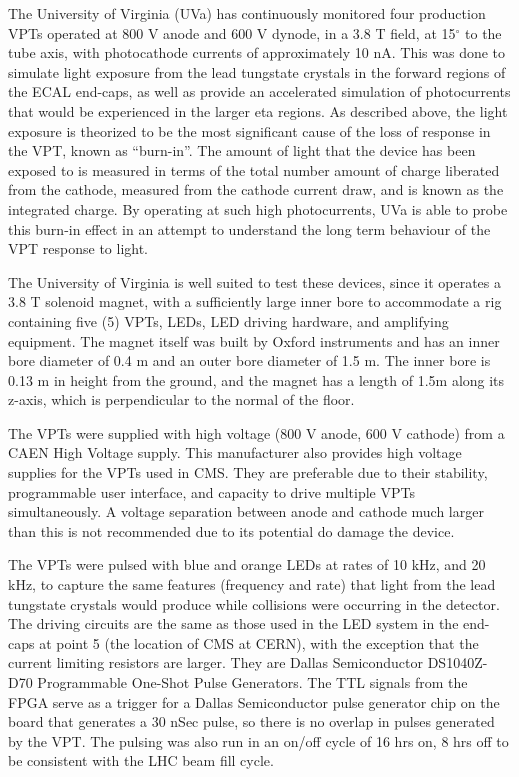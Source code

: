 \par The University of Virginia (UVa) has continuously monitored four
production VPTs operated at 800 V anode and 600 V dynode, in a 3.8 T
field, at 15$^\circ$ to the tube axis, with photocathode currents of
approximately 10 nA.  This was done to simulate light exposure from
the lead tungstate crystals in the forward regions of the ECAL
end-caps, as well as provide an accelerated simulation of
photocurrents that would be experienced in the larger eta regions.  As
described above, the light exposure is theorized
to be the most significant cause of the loss of response in the VPT,
known as “burn-in”.  The amount of light that the device has been
exposed to is measured in terms of the total number amount of charge
liberated from the cathode, measured from the cathode current draw,
and is known as the integrated charge.  By operating at such high
photocurrents, UVa is able to probe this burn-in effect in an attempt
to understand the long term behaviour of the VPT response to light.  

\par The University of Virginia is well suited to test these devices,
since it operates a 3.8 T solenoid magnet, with a sufficiently large
inner bore to accommodate a rig containing five (5) VPTs, LEDs, LED
driving hardware, and amplifying equipment.  The magnet itself was
built by Oxford instruments and has an inner bore diameter of 0.4 m
and an outer bore diameter of 1.5 m.  The inner bore is 0.13 m in
height from the ground, and the magnet has a length of 1.5m along its
z-axis, which is perpendicular to the normal of the floor. 

\par The VPTs were supplied with high voltage (800 V anode, 600 V
cathode) from a CAEN High Voltage supply.  This manufacturer also
provides high voltage supplies for the VPTs used in CMS.  They are
preferable due to their stability, programmable user interface, and
capacity to drive multiple VPTs simultaneously.  A voltage separation
between anode and cathode much larger than this is not recommended due
to its potential do damage the device.  

\par The VPTs were pulsed with blue and orange LEDs at rates of 10
kHz, and 20 kHz, to capture the same features (frequency and rate)
that light from the lead tungstate crystals would produce while
collisions were occurring in the detector.  The driving circuits are
the same as those used in the LED system in the end-caps at point 5
(the location of CMS at CERN), with the exception that the current
limiting resistors are larger.  They are Dallas Semiconductor
DS1040Z-D70 Programmable One-Shot Pulse Generators.  The TTL signals
from the FPGA serve as a trigger for a Dallas Semiconductor pulse
generator chip on the board that generates a 30 nSec pulse, so there
is no overlap in pulses generated by the VPT.  The pulsing was also
run in an on/off cycle of 16 hrs on, 8 hrs off to be consistent with
the LHC beam fill cycle.   

